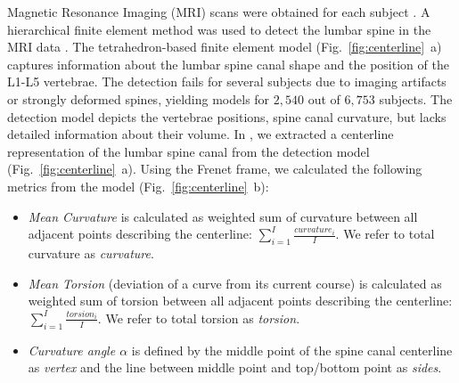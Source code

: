 \documentclass[a4paper,twoside]{style/article}
\begin{document}
Magnetic Resonance Imaging (MRI) scans were obtained for each subject \cite{Hegenscheid2013}.
A hierarchical finite element method was used to detect the lumbar spine in the MRI data \cite{Rak2013}.
The tetrahedron-based finite element model (Fig.~\ref{fig:centerline}~a) captures information about the lumbar spine canal shape and the position of the L1-L5 vertebrae.
The detection fails for several subjects due to imaging artifacts or strongly deformed spines, yielding models for $2,540$ out of $6,753$ subjects.
The detection model depicts the vertebrae positions, spine canal curvature, but lacks detailed information about their volume.
In \cite{Klemm2013VMV}, we extracted a centerline representation of the lumbar spine canal from the detection model (Fig.~\ref{fig:centerline}~a).
Using the Frenet frame, we calculated the following metrics from the model (Fig.~\ref{fig:centerline}~b): %
\begin{itemize}
	\item \emph{Mean Curvature} is calculated as weighted sum of curvature between all adjacent points describing the centerline: $\sum_{i=1}^I \frac{curvature_i}{I}$. We refer to total curvature as \emph{curvature}.
	\item \emph{Mean Torsion} (deviation of a curve from its current course) is calculated as weighted sum of torsion between all adjacent points describing the centerline: $\sum_{i=1}^I \frac{torsion_i}{I}$. We refer to total torsion as \emph{torsion}.
	\item \emph{Curvature angle $\alpha$} is defined by the middle point of the spine canal centerline as \emph{vertex} and the line between middle point and top/bottom point as \emph{sides}.
\end{itemize}
\end{document}
